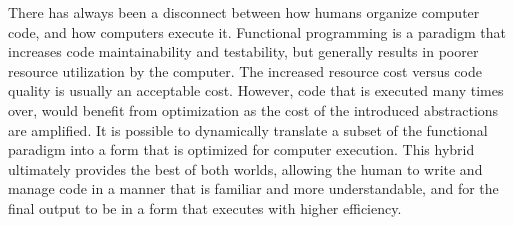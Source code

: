 There has always been a disconnect between how humans organize computer code, and how computers execute it.  Functional programming is a paradigm that increases code maintainability and testability, but generally results in poorer resource utilization by the computer.  The increased resource cost versus code quality is usually an acceptable cost. However, code that is executed many times over, would benefit from optimization as the cost of the introduced abstractions are amplified. It is possible to dynamically translate a subset of the functional paradigm into a form that is optimized for computer execution. This hybrid ultimately provides the best of both worlds, allowing the human to write and manage code in a manner that is familiar and more understandable, and for the final output to be in a form that executes with higher efficiency.